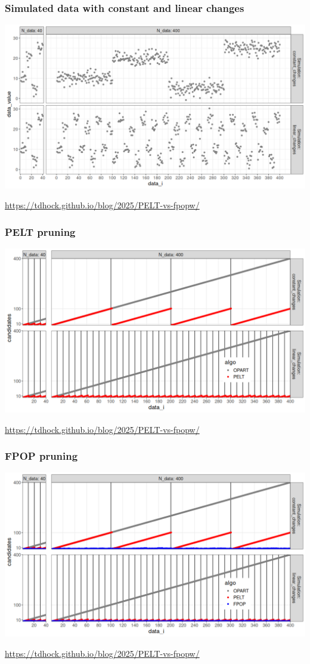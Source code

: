 \documentclass{beamer}
\begin{document}

\begin{frame}
  \frametitle{Simulated data with constant and linear changes}
  \includegraphics[width=\textwidth]{figure-sim-linear-constant-changes.png}

  \url{https://tdhock.github.io/blog/2025/PELT-vs-fpopw/}
\end{frame}

\begin{frame}
  \frametitle{PELT pruning}
  \includegraphics[width=\textwidth]{pelt-prune-1.png}

  \url{https://tdhock.github.io/blog/2025/PELT-vs-fpopw/}
\end{frame}

\begin{frame}
  \frametitle{FPOP pruning}
  \includegraphics[width=\textwidth]{fpop-prune-1.png}

  \url{https://tdhock.github.io/blog/2025/PELT-vs-fpopw/}
\end{frame}
 
\end{document}

